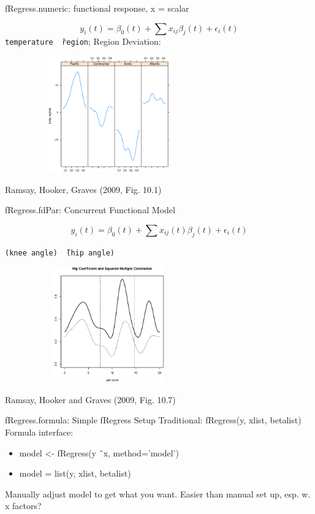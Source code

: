 \documentclass[compress]{beamer}
\begin{document}

\begin{frame}{fRegress.numeric:  functional response, x = scalar}

\[ y_i(t) = \beta_0(t) + \sum x_{ij} \beta_j(t) + \epsilon_i(t) \]
\texttt{temperature \~\ region};  Region Deviation:

\includegraphics[height=5cm, width=9cm]{figs/tempregionbeta2}

Ramsay, Hooker, Graves (2009, Fig. 10.1)

\end{frame}


\begin{frame}{fRegress.fdPar:  Concurrent Functional Model}

\[ y_i(t) = \beta_0(t) + \sum x_{ij}(t) \beta_j(t) + \epsilon_i(t) \]

\texttt{(knee angle) \~\ (hip angle)}

\includegraphics[height=5cm, width=9cm]{figs/gaitregression1a}

Ramsay, Hooker and Graves (2009, Fig. 10.7)

\end{frame}


\begin{frame}{fRegress.formula:  Simple fRegress Setup}
Traditional:  fRegress(y, xlist, betalist) 
\newline \newline
Formula interface: 
\begin{itemize} 
    \item model <- fRegress(y \~\ x, method='model') 
    \item model = list(y, xlist, betalist) 
\end{itemize}
Manually adjust model to get what you want.
\newline \newline
Easier than manual set up, esp. w. x factors? 

\end{frame}
\end{document}
